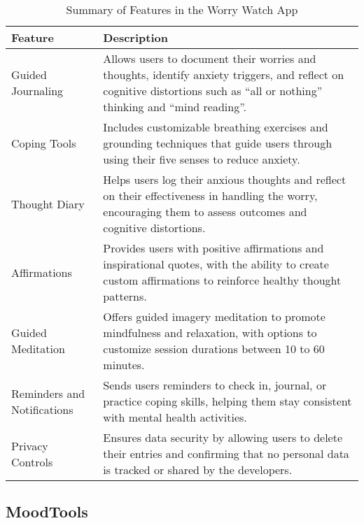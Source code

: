 \FloatBarrier
\begin{table}[ht]
\centering
\begin{tabular}{|p{4cm}|p{10cm}|}
\hline
\textbf{Feature} & \textbf{Description} \\ \hline
Guided Journaling & Allows users to document their worries and thoughts, identify anxiety triggers, and reflect on cognitive distortions such as ``all or nothing'' thinking and ``mind reading''. \\ \hline
Coping Tools & Includes customizable breathing exercises and grounding techniques that guide users through using their five senses to reduce anxiety. \\ \hline
Thought Diary & Helps users log their anxious thoughts and reflect on their effectiveness in handling the worry, encouraging them to assess outcomes and cognitive distortions. \\ \hline
Affirmations & Provides users with positive affirmations and inspirational quotes, with the ability to create custom affirmations to reinforce healthy thought patterns. \\ \hline
Guided Meditation & Offers guided imagery meditation to promote mindfulness and relaxation, with options to customize session durations between 10 to 60 minutes. \\ \hline
Reminders and Notifications & Sends users reminders to check in, journal, or practice coping skills, helping them stay consistent with mental health activities. \\ \hline
Privacy Controls & Ensures data security by allowing users to delete their entries and confirming that no personal data is tracked or shared by the developers. \\ \hline
\end{tabular}
\caption{Summary of Features in the Worry Watch App}
\label{tab:worrywatch_features}
\end{table}
\FloatBarrier

\subsection{MoodTools}

